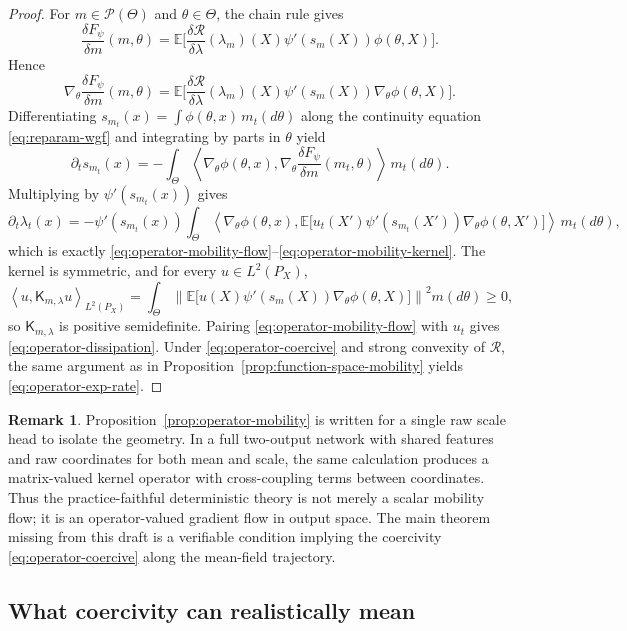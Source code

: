 \documentclass[11pt]{article}
\theoremstyle{definition}
\newtheorem{remark}[theorem]{Remark}
\newcommand{\E}{\mathbb{E}}
\newcommand{\ip}[2]{\left\langle #1, #2 \right\rangle}
\newcommand{\mc}[1]{\mathcal{#1}}
\begin{document}
\begin{proof}
For $m\in \mc{P}(\Theta)$ and $\theta\in\Theta$, the chain rule gives
\[
  \frac{\delta F_\psi}{\delta m}(m,\theta)
  =
  \E\Big[
    \frac{\delta \mc{R}}{\delta \lambda}(\lambda_m)(X)
    \psi'(s_m(X))
    \phi(\theta,X)
  \Big].
\]
Hence
\[
  \nabla_\theta \frac{\delta F_\psi}{\delta m}(m,\theta)
  =
  \E\Big[
    \frac{\delta \mc{R}}{\delta \lambda}(\lambda_m)(X)
    \psi'(s_m(X))
    \nabla_\theta \phi(\theta,X)
  \Big].
\]
Differentiating $s_{m_t}(x)=\int \phi(\theta,x)\,m_t(d\theta)$ along the
continuity equation \eqref{eq:reparam-wgf} and integrating by parts in $\theta$
yield
\[
  \partial_t s_{m_t}(x)
  =
  -
  \int_\Theta
  \ip{
    \nabla_\theta \phi(\theta,x)
  }{
    \nabla_\theta \frac{\delta F_\psi}{\delta m}(m_t,\theta)
  }
  \,m_t(d\theta).
\]
Multiplying by $\psi'(s_{m_t}(x))$ gives
\[
  \partial_t \lambda_t(x)
  =
  -
  \psi'(s_{m_t}(x))
  \int_\Theta
  \ip{
    \nabla_\theta \phi(\theta,x)
  }{
    \E\big[u_t(X')\psi'(s_{m_t}(X'))\nabla_\theta \phi(\theta,X')\big]
  }
  \,m_t(d\theta),
\]
which is exactly \eqref{eq:operator-mobility-flow}--\eqref{eq:operator-mobility-kernel}.
The kernel is symmetric, and for every $u\in L^2(P_X)$,
\[
  \ip{u}{\mathsf{K}_{m,\lambda}u}_{L^2(P_X)}
  =
  \int_\Theta
  \left\|
    \E\big[
      u(X)\psi'(s_m(X))\nabla_\theta \phi(\theta,X)
    \big]
  \right\|^2
  m(d\theta)
  \ge 0,
\]
so $\mathsf{K}_{m,\lambda}$ is positive semidefinite. Pairing
\eqref{eq:operator-mobility-flow} with $u_t$ gives
\eqref{eq:operator-dissipation}. Under \eqref{eq:operator-coercive} and strong
convexity of $\mc{R}$, the same argument as in
Proposition~\ref{prop:function-space-mobility} yields
\eqref{eq:operator-exp-rate}.
\end{proof}

\begin{remark}
Proposition~\ref{prop:operator-mobility} is written for a single raw scale head
to isolate the geometry. In a full two-output network with shared features and
raw coordinates for both mean and scale, the same calculation produces a
matrix-valued kernel operator with cross-coupling terms between coordinates.
Thus the practice-faithful deterministic theory is not merely a scalar mobility
flow; it is an operator-valued gradient flow in output space. The main theorem
missing from this draft is a verifiable condition implying the coercivity
\eqref{eq:operator-coercive} along the mean-field trajectory.
\end{remark}

\subsection{What coercivity can realistically mean}
\end{document}
